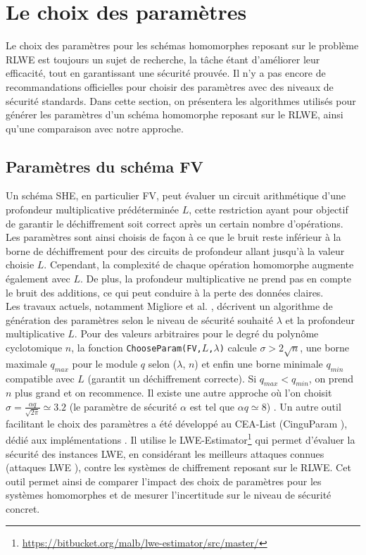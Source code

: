 \documentclass[11pt, headsepline, a4paper, fleqn, oneside]{article}
\begin{document}
\section{Le choix des paramètres}
Le choix des paramètres pour les schémas homomorphes reposant sur le problème RLWE est toujours un sujet de recherche, la tâche étant d'améliorer leur efficacité, tout en garantissant une sécurité prouvée. Il n'y a pas encore de recommandations officielles pour choisir des paramètres avec des niveaux de sécurité standards. Dans cette section, on présentera les algorithmes utilisés pour générer les paramètres d'un schéma homomorphe reposant sur le RLWE, ainsi qu'une comparaison avec notre approche.

\subsection{Paramètres du schéma FV}
Un schéma SHE, en particulier FV, peut évaluer un circuit arithmétique d'une profondeur multiplicative prédéterminée $L$, cette restriction ayant pour objectif de garantir le déchiffrement soit correct après un certain nombre d'opérations. Les paramètres sont ainsi choisis de façon à ce que le bruit reste inférieur à la borne de déchiffrement pour des circuits de profondeur allant jusqu'à la valeur choisie $L$. Cependant, la complexité de chaque opération homomorphe augmente également avec $L$. De plus, la profondeur multiplicative ne prend pas en compte le bruit des additions, ce qui peut conduire à la perte des données claires.\\
Les travaux actuels, notamment Migliore et al. \cite{migliore:hal-01394362}, décrivent un algorithme de génération des paramètres selon le niveau de sécurité souhaité $\lambda$ et la profondeur multiplicative $L$. Pour des valeurs arbitraires pour le degré du polynôme cyclotomique $n$, la fonction \texttt{ChooseParam(FV,$L$,$\lambda$)} calcule $\sigma > 2\sqrt{n}$, une borne maximale $q_{max}$ pour le module $q$ selon ($\lambda$, $n$) et enfin une borne minimale $q_{min}$ compatible avec $L$ (garantit un déchiffrement correcte). Si $q_{max} < q_{min}$, on prend $n$ plus grand et on recommence. Il existe une autre approche où l'on choisit $\sigma = \frac{\alpha q}{\sqrt{2\pi}} \simeq 3.2$ (le paramètre de sécurité $\alpha$ est tel que $\alpha q \simeq 8$) \cite{HomomorphicEncryptionSecurityStandard}.
Un autre outil facilitant le choix des paramètres a été développé au CEA-List (CinguParam \cite{CinguParam}), dédié aux implémentations \cite{sealcrypto,Cingulata, FV-NFLlib}. Il utilise le LWE-Estimator\footnote{\url{https://bitbucket.org/malb/lwe-estimator/src/master/}} \cite{cryptoeprint:2015:046} qui permet d’évaluer la sécurité des instances LWE, en considérant les meilleurs attaques connues (attaques LWE \cite{cryptoeprint:2015:1092,HomomorphicEncryptionSecurityStandard}), contre les systèmes de chiffrement reposant sur le RLWE. Cet outil permet ainsi de comparer l’impact des choix de paramètres pour les systèmes homomorphes et de mesurer l’incertitude sur le niveau de sécurité concret.\\
\end{document}
